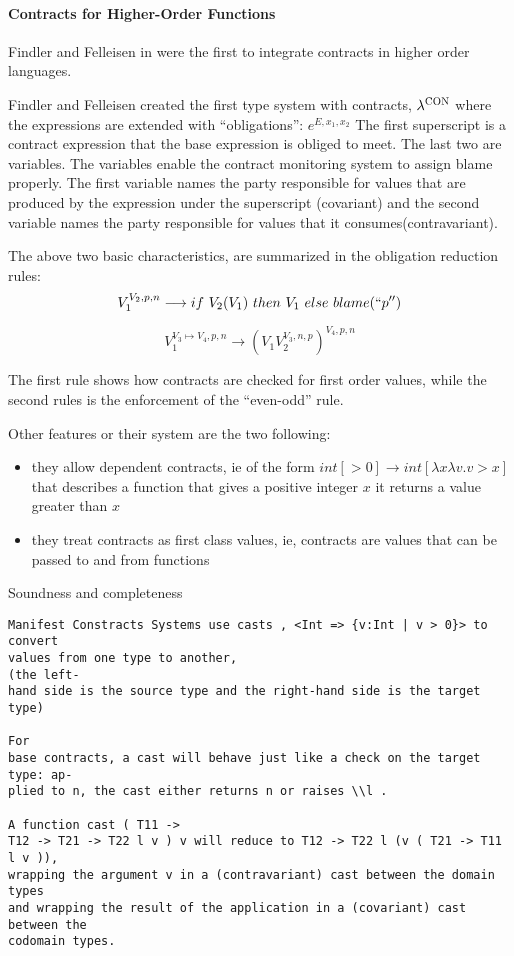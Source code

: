  
\paragraph*{Contracts for Higher-Order Functions}
Findler and Felleisen in \cite{Findler02} were the first to
integrate contracts in higher order languages.




Findler and Felleisen  created the first type system with contracts, $\lambda^{\textsc{CON}}$ 
where the expressions are extended with ``obligations'':
$e^{E, x_1, x_2}$
The first superscript is a contract expression that the base expression
is obliged to meet. The last two are variables. The variables enable
the contract monitoring system to assign blame properly. The first
variable names the party responsible for values that are produced by
the expression under the superscript (covariant) and the second variable names
the party responsible for values that it consumes(contravariant).


The above two basic characteristics, are summarized in the obligation reduction rules:
$$
V_1^{V_2, p, n} \longrightarrow if \ V_2(V_1) \ then \  V_1  \ else \ blame(``p'')
$$

$$
V_1^{V_3\longmapsto V_4, p, n} \longrightarrow (V_1 V_2^{V_3, n, p})^{V_4, p, n}
$$

The first rule shows how contracts are checked for first order values, while
the second rules is the enforcement of the ``even-odd'' rule.

Other features or their system are the two following:
\begin{itemize}
\item they allow dependent contracts, ie of the form $int [>0] \rightarrow int [\lambda x \lambda v. v >x]$
that describes a function that gives a positive integer $x$ it returns a value greater than $x$
\item they treat contracts as first class values, ie, contracts are values that can be passed to and from functions
\end{itemize}


Soundness and completeness \cite{BlumeM06}

\begin{verbatim}
Manifest Constracts Systems use casts , <Int => {v:Int | v > 0}> to convert 
values from one type to another,
(the left-
hand side is the source type and the right-hand side is the target type)

For
base contracts, a cast will behave just like a check on the target type: ap-
plied to n, the cast either returns n or raises \\l . 

A function cast ( T11 ->
T12 -> T21 -> T22 l v ) v will reduce to T12 -> T22 l (v ( T21 -> T11 l v )),
wrapping the argument v in a (contravariant) cast between the domain types
and wrapping the result of the application in a (covariant) cast between the
codomain types.

\end{verbatim}


